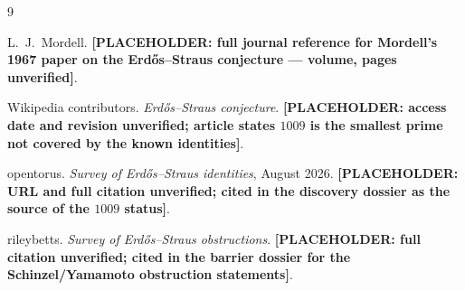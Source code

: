 \documentclass[11pt,a4paper]{article}
\theoremstyle{definition}
\begin{document}
\begin{thebibliography}{9}

L.~J.~Mordell.
\textbf{[PLACEHOLDER: full journal reference for Mordell's 1967 paper on
the Erd\H{o}s--Straus conjecture --- volume, pages unverified]}.

Wikipedia contributors.
\textit{Erd\H{o}s--Straus conjecture}.
\textbf{[PLACEHOLDER: access date and revision unverified; article states
$1009$ is the smallest prime not covered by the known identities]}.

opentorus.
\textit{Survey of Erd\H{o}s--Straus identities}, August 2026.
\textbf{[PLACEHOLDER: URL and full citation unverified; cited in the
discovery dossier as the source of the $1009$ status]}.

rileybetts.
\textit{Survey of Erd\H{o}s--Straus obstructions}.
\textbf{[PLACEHOLDER: full citation unverified; cited in the barrier
dossier for the Schinzel/Yamamoto obstruction statements]}.

\end{thebibliography}
\end{document}
